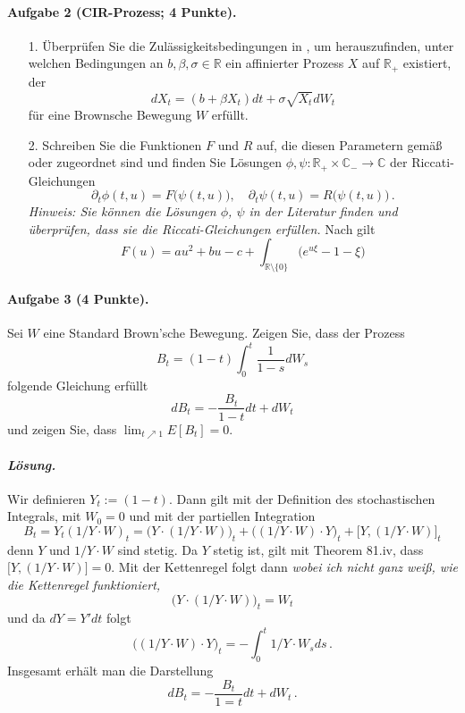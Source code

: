 \documentclass{article}
\begin{document}
\paragraph{Aufgabe 2 \textnormal{(CIR-Prozess; 4 Punkte)}.}
\begin{enumerate}
\item [1.] Überprüfen Sie die Zulässigkeitsbedingungen in \cite{duffie}, um herauszufinden, unter welchen Bedingungen an $b,\beta, \sigma\in\mathbb{R}$ ein affinierter Prozess $X$ auf $\mathbb{R}_+$ existiert, der
  \[
    dX_t=(b+\beta X_t)dt+\sigma\sqrt{X_t}dW_t
  \]
  für eine Brownsche Bewegung $W$ erfüllt.
\item [2.] Schreiben Sie die Funktionen $F$ und $R$ auf, die diesen Parametern gemäß \cite[Theorem 7]{cuchiero2013path} oder \cite[Theorem 2.7]{duffie} zugeordnet sind und finden Sie Lösungen $\phi,\psi\colon \mathbb{R}_+\times \mathbb{C}_-\to\mathbb{C}$ der Riccati-Gleichungen
  \[
    \partial_t\phi(t,u)=F\bigl(\psi(t,u)\bigr),\quad \partial_t\psi(t,u)= R\bigl(\psi(t,u)\bigr)\,.
  \]
  \emph{Hinweis: Sie können die Lösungen $\phi$, $\psi$ in der Literatur finden und überprüfen, dass sie die Riccati-Gleichungen erfüllen.}
  Nach \cite[Theorem 2.7]{duffie} gilt
  \[
    F(u)=au^2+bu-c+\int_{\mathbb{R}\setminus\{0\}}\bigl(e^{u\xi}-1-\xi\bigr)
  \]
\end{enumerate}

\paragraph{Aufgabe 3 \textnormal{(4 Punkte)}.}
Sei $W$ eine Standard Brown'sche Bewegung.
Zeigen Sie, dass der Prozess
\[
B_t=(1-t)\int_0^t\frac{1}{1-s}dW_s
\]
folgende Gleichung erfüllt
\[
dB_t=-\frac{B_t}{1-t}dt+dW_t
\]
und zeigen Sie, dass $\lim_{t\nearrow 1}E[B_t]=0$.

\paragraph{\textnormal{\emph{Lösung.}}}
Wir definieren $Y_t:=(1-t)$.
Dann gilt mit der Definition des stochastischen Integrals, mit $W_0=0$ und mit der partiellen Integration
\[
B_t=Y_t(1/Y\cdot W)_t=\bigl(Y\cdot(1/Y\cdot W)\bigr)_t+\bigl((1/Y\cdot W)\cdot Y\bigr)_t+\bigl[Y,(1/Y\cdot W)\bigr]_t
\]
denn $Y$ und $1/Y\cdot W$ sind stetig.
Da $Y$ stetig ist, gilt mit Theorem 81.iv, dass $\bigl[Y,(1/Y\cdot W)\bigr]=0$.
Mit der Kettenregel folgt dann \emph{wobei ich nicht ganz weiß, wie die Kettenregel funktioniert,}
\[
\bigl(Y\cdot (1/Y\cdot W)\bigr)_t=W_t
\]
und da $dY=Y'dt$ folgt
\[
\bigl((1/Y\cdot W)\cdot Y\bigr)_t=-\int_0^t1/Y\cdot W_s ds\,.
\]
Insgesamt erhält man die Darstellung
\[
dB_t=-\frac{B_t}{1=t}dt+dW_t\,.
\]
\end{document}
